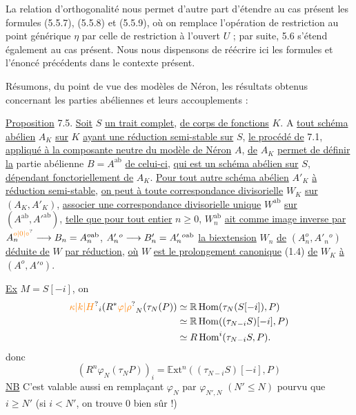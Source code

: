 La relation d'orthogonalité nous permet d'autre part d'étendre au cas présent les formules (5.5.7), (5.5.8) et (5.5.9), où on remplace l'opération de restriction au point générique $\eta$ par celle de restriction à l'ouvert $U$ ; par suite, 5.6 s'étend également au cas présent. Nous nous dispensons de réécrire ici les formules et l'énoncé précédents dans le contexte présent.

Résumons, du point de vue des modèles de Néron, les résultats obtenus concernant les parties abéliennes et leurs accouplements :

\uline{Proposition} 7.5. \uline{Soit} $S$ \uline{un trait complet}, \uline{de corps de fonctions} $K$. A \uline{tout schéma abélien} $A_K$ \uline{sur} $K$ \uline{ayant une réduction semi-stable sur} $S$, \uline{le procédé de} 7.1, \uline{appliqué à la composante neutre du modèle de Néron} $A$, \uline{de} $A_K$ \uline{permet de définir la} partie abélienne $B=A^{\mathrm{ab}}$ \uline{de celui-ci}, \uline{qui est un schéma abélien sur} $S$, \uline{dépendant fonctoriellement de} $A_K$. \uline{Pour tout autre schéma abélien} $A'_K$ \uline{à réduction semi-stable}, \uline{on peut à toute correspondance divisorielle} $W_K$ \uline{sur} $(A_K,A'_K)$, \uline{associer une correspondance divisorielle unique} $W^{\mathrm{ab}}$ \uline{sur} $(A^{\mathrm{ab}},A'^{\mathrm{ab}})$, \uline{telle que pour tout entier} $n\geq 0$, $W_n^{\mathrm{ab}}$ \uline{ait comme image inverse par} $A_n^{\unsure{o|0|\circ}}\handwritten{\longrightarrow} B_n=A_n^{o\mathrm{ab}}$, $A'_n{}^o\longrightarrow B'_n=A'_n{}^{o\mathrm{ab}}$ \uline{la biextension} $W_n$ \uline{de} $(A_n^o,A'_n{}^o)$ \uline{déduite de} $W$ \uline{par réduction}, \uline{où} $W$ \uline{est le prolongement canonique} (1.4) \uline{de} $W_K$ \uline{à} $(A^o,A'{}^o)$.


\uline{Ex} \quad $M=S[-i]$, on 
\[
\begin{aligned}
\unsure{\kappa|k|H}_i(R^*\unsure{\varphi|\rho}_N(\tau_N(P))&\simeq\mathbb R\operatorname{Hom}(\tau_N(S[-i]),P)\\
&\simeq\mathbb R\operatorname{Hom}((\tau_{N-i}S)[-i],P)\\
&\simeq R\operatorname{Hom}^i(\tau_{N-i}S,P).
\end{aligned}
\]
donc
\[
(R^n\varphi_N(\tau_N P))_i=\mathbb E\mathrm{xt}^n((\tau_{N-i}S)[-i],P)
\]
\uline{NB} C'est valable aussi en remplaçant $\varphi_N$ par $\varphi_{N',N}$ $(N'\leq N)$ pourvu que $i\geq N'$ (si $i<N'$, on trouve 0 bien sûr !)

